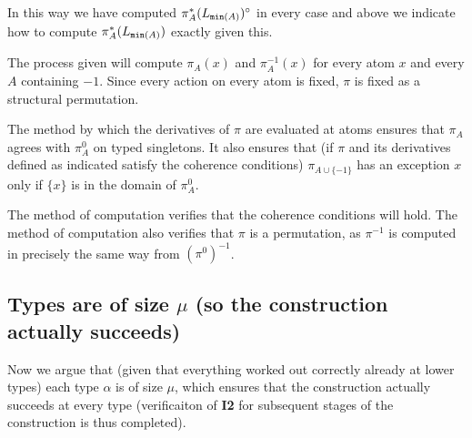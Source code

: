 \documentclass[112pt]{article}
\begin{document}
\begin{description}
In this way we have computed $\pi^*_A(L_{{\tt min}(A)})^\circ$ in every case and above we indicate how to compute $\pi^*_A(L_{{\tt min}(A)})$ exactly given this.

 The process given will compute $\pi_A(x)$ and $\pi_A^{-1}(x)$ for every atom $x$ and every $A$ containing $-1$.  Since every action on every atom is fixed, $\pi$ is fixed as a structural permutation.

The method by which the derivatives of $\pi$ are evaluated at atoms ensures that $\pi_A$ agrees with $\pi^0_A$ on typed singletons.  It also ensures that (if $\pi$ and its derivatives defined as indicated satisfy
the coherence conditions) $\pi_{A \cup \{-1\}}$ has an exception $x$ only if $\{x\}$ is in the domain of $\pi^0_A$.

The method of computation verifies that the coherence conditions will hold.  The method of computation also verifies that $\pi$ is a permutation, as $\pi^{-1}$ is computed in precisely the same way from $(\pi^0)^{-1}$.

\end{description}

\newpage
\subsection{Types are of size $\mu$ (so the construction actually succeeds)}

Now we argue that (given that everything worked out correctly already at lower types) each type $\alpha$ is of size $\mu$, which ensures
that the construction actually succeeds at every type (verificaiton of {\bf I2} for subsequent stages of the construction is thus completed).
\end{document}
